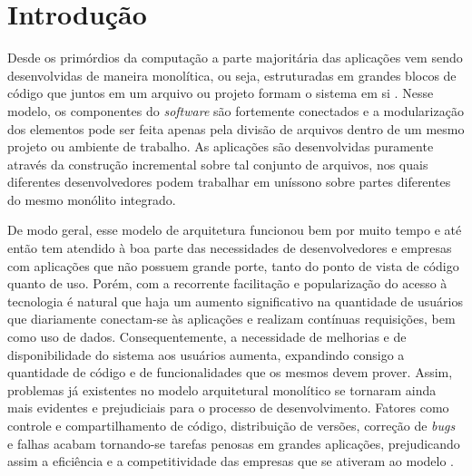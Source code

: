 \chapter{Introdução}
\label{ch:intro}

Desde os primórdios da computação a parte majoritária das aplicações vem sendo desenvolvidas de maneira monolítica, ou seja, estruturadas em grandes blocos de código que juntos em um arquivo ou projeto formam o sistema em si \cite{microsservicos:definicao_microsservicos}.
%
Nesse modelo, os componentes do \textit{software} são fortemente conectados e a modularização dos elementos pode ser feita apenas pela divisão de arquivos dentro de um mesmo projeto ou ambiente de trabalho.
%
As aplicações são desenvolvidas puramente através da construção incremental sobre tal conjunto de arquivos, nos quais diferentes desenvolvedores podem trabalhar em uníssono sobre partes diferentes do mesmo monólito integrado.

%
%

%
De modo geral, esse modelo de arquitetura funcionou bem por muito tempo e até então tem atendido à boa parte das necessidades de desenvolvedores e empresas com aplicações que não possuem grande porte, tanto do ponto de vista de código quanto de uso.
%
Porém, com a recorrente facilitação e popularização do acesso à tecnologia é natural que haja um aumento significativo na quantidade de usuários que diariamente conectam-se às aplicações e realizam contínuas requisições, bem como uso de dados.
%
Consequentemente, a necessidade de melhorias e de disponibilidade do sistema aos usuários aumenta, expandindo consigo a quantidade de código e de funcionalidades que os mesmos devem prover.
%
Assim, problemas já existentes no modelo arquitetural monolítico se tornaram ainda mais evidentes e prejudiciais para o processo de desenvolvimento.
%
Fatores como controle e compartilhamento de código, distribuição de versões, correção de \textit{bugs} e falhas acabam tornando-se tarefas penosas em grandes aplicações, prejudicando assim a eficiência e a competitividade das empresas que se ativeram ao modelo \cite{microsservicos:uber}.

